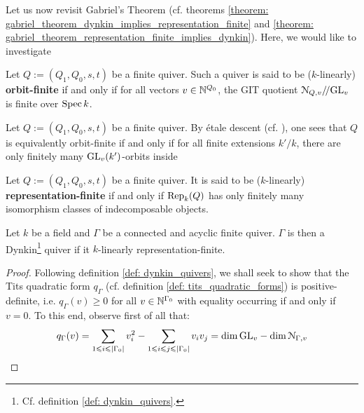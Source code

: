             Let us now revisit Gabriel's Theorem (cf. theorems \ref{theorem: gabriel_theorem_dynkin_implies_representation_finite} and \ref{theorem: gabriel_theorem_representation_finite_implies_dynkin}). Here, we would like to investigate 
            \begin{definition} \label{def: orbit_finite_quivers}
                Let $Q := (Q_1, Q_0, s, t)$ be a finite quiver. Such a quiver is said to be ($k$-linearly) \textbf{orbit-finite} if and only if for all vectors $v \in \mathbb{N}^{Q_0}$, the GIT quotient $\mathcal{N}_{Q, v} /\!/ \mathrm{GL}_v$ is finite over $\operatorname{Spec} k$.
            \end{definition}
            \begin{remark}
                Let $Q := (Q_1, Q_0, s, t)$ be a finite quiver. By \'etale descent (cf. \cite[\href{https://stacks.math.columbia.edu/tag/04DH}{Tag 04DH}]{stacks}), one sees that $Q$ is equivalently orbit-finite if and only if for all finite extensions $k'/k$, there are only finitely many $\mathrm{GL}_v(k')$-orbits inside 
            \end{remark}
            \begin{definition} \label{def: representation_finite_quivers}
                Let $Q := (Q_1, Q_0, s, t)$ be a finite quiver. It is said to be ($k$-linearly) \textbf{representation-finite} if and only if $\mathrm{Rep}_k(Q)$ has only finitely many isomorphism classes of indecomposable objects. 
            \end{definition}
            \begin{theorem} \label{theorem: geometric_gabriel_theorem_representation_finite_implies_dynkin}
                Let $k$ be a field and $\Gamma$ be a connected and acyclic finite quiver. $\Gamma$ is then a Dynkin\footnote{Cf. definition \ref{def: dynkin_quivers}.} quiver if it $k$-linearly representation-finite.
            \end{theorem}
                \begin{proof}
                    Following definition \ref{def: dynkin_quivers}, we shall seek to show that the Tits quadratic form $q_{\Gamma}$ (cf. definition \ref{def: tits_quadratic_forms}) is positive-definite, i.e. $q_{\Gamma}(v) \geq 0$ for all $v \in \mathbb{N}^{\Gamma_0}$ with equality occurring if and only if $v = 0$. To this end, observe first of all that:
                        $$q_{\Gamma}(v) = \sum_{1 \leqslant i \leqslant |\Gamma_0|} v_i^2 - \sum_{1 \leqslant i \leqslant j \leqslant |\Gamma_0|} v_i v_j = \dim \mathrm{GL}_v - \dim \mathcal{N}_{\Gamma, v}$$
                \end{proof}
        
